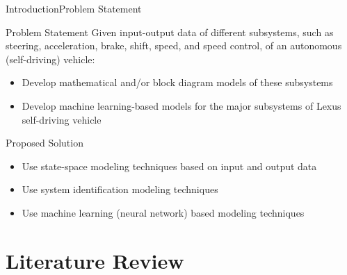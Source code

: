 \documentclass{beamer}
\begin{document}
\begin{frame}{Introduction}{Problem Statement}
  \begin{block}{Problem Statement}
    Given input-output data of different subsystems, such as steering, acceleration, brake, shift, speed, and speed control, of an autonomous (self-driving) vehicle:
    \begin{itemize}
    \item Develop mathematical and/or block diagram models of these subsystems 
      
    \item Develop machine learning-based models for the major subsystems of Lexus self-driving vehicle
    \end{itemize}
  \end{block}
  \pause
  \begin{block}{Proposed Solution}
    \begin{itemize}
    \item Use state-space modeling techniques based on input and output data 
     
    \item Use system identification modeling techniques
      
    \item Use machine learning (neural network) based modeling techniques
    \end{itemize}
  \end{block}
\end{frame}


\section{Literature Review}
\end{document}
